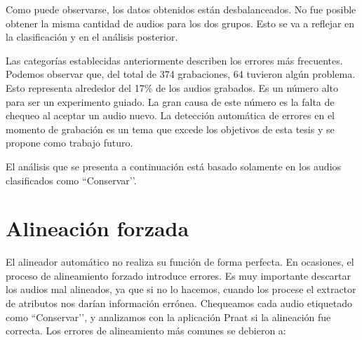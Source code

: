 Como puede observarse, los datos obtenidos están desbalanceados. No fue posible obtener la misma cantidad de audios para los dos grupos. Esto se va a reflejar en la clasificación y en el análisis posterior.

Las categorías establecidas anteriormente describen los errores más frecuentes. Podemos observar que, del total de 374 grabaciones, 64 tuvieron algún problema. Esto representa alrededor del 17\% de los audios grabados. Es un número alto para ser un experimento guiado. La gran causa de este número es la falta de chequeo al aceptar un audio nuevo. La detección automática de errores en el momento de grabación es un tema que excede los objetivos de esta tesis y se propone como trabajo futuro.

El análisis que se presenta a continuación está basado solamente en los audios clasificados como ``Conservar’’.

\section{Alineación forzada}

El alineador automático no realiza su función de forma perfecta. En ocasiones, el proceso de alineamiento forzado introduce errores. Es muy importante descartar los audios mal alineados, ya que si no lo hacemos, cuando los procese el extractor de atributos nos darían información errónea. Chequeamos cada audio etiquetado como ``Conservar’’, y analizamos con la aplicación Praat \cite{praat} si la alineación fue correcta. Los errores de alineamiento más comunes se debieron a:

